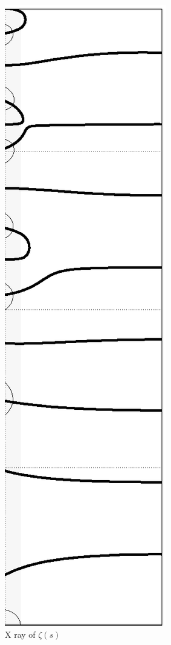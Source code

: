 \documentclass[a4paper]{amsart}
\numberwithin{equation}{section}
\begin{document}
\begin{figure}
\includegraphics[width=\hsize]{figure01.ps}
\caption{X ray of  $\zeta(s)$}
\end{figure}
\end{document}
